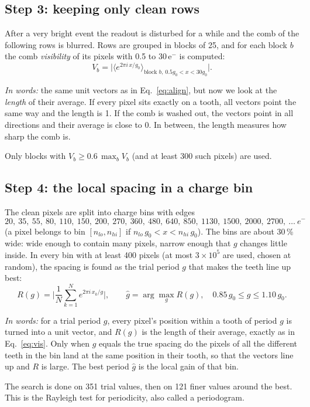 \documentclass[11pt,a4paper]{article}
\newcommand{\eminus}{e$^-$}
\newcommand{\inwords}[1]{\par\noindent\textit{In words:} #1\par}
\begin{document}
\subsection{Step 3: keeping only clean rows}
After a very bright event the readout is disturbed for a while and the comb of the following rows is
blurred. Rows are grouped in blocks of 25, and for each block $b$ the comb \emph{visibility} of its
pixels with 0.5 to 30\,\eminus{} is computed:
\begin{equation}
V_b = \Big| \Big\langle e^{2\pi i\,x/g_0} \Big\rangle_{\text{block } b,\ 0.5 g_0 < x < 30 g_0} \Big| .
\label{eq:vis}
\end{equation}
\inwords{the same unit vectors as in Eq.~\ref{eq:align}, but now we look at the \emph{length} of their
average. If every pixel sits exactly on a tooth, all vectors point the same way and the length is 1.
If the comb is washed out, the vectors point in all directions and their average is close to 0.
In between, the length measures how sharp the comb is.} Only blocks with $V_b \ge 0.6\,\max_b V_b$
(and at least 300 such pixels) are used.

\subsection{Step 4: the local spacing in a charge bin}
\label{sec:R}
The clean pixels are split into charge bins with edges
\[ 20,\ 35,\ 55,\ 80,\ 110,\ 150,\ 200,\ 270,\ 360,\ 480,\ 640,\ 850,\ 1130,\ 1500,\ 2000,\ 2700,\ \dots\ e^- \]
(a pixel belongs to bin $[n_{lo}, n_{hi}]$ if $n_{lo}\,g_0 < x < n_{hi}\,g_0$). The bins are about 30\,\%
wide: wide enough to contain many pixels, narrow enough that $g$ changes little inside. In every bin
with at least 400 pixels (at most $3\times10^5$ are used, chosen at random), the spacing is found as the
trial period $g$ that makes the teeth line up best:
\begin{equation}
R(g) = \Big| \frac{1}{N} \sum_{k=1}^{N} e^{2\pi i\,x_k/g} \Big|, \qquad
\hat g = \arg\max_{g} R(g), \quad 0.85\,g_0 \le g \le 1.10\,g_0 .
\label{eq:R}
\end{equation}
\inwords{for a trial period $g$, every pixel's position within a tooth of period $g$ is turned into a
unit vector, and $R(g)$ is the length of their average, exactly as in Eq.~\ref{eq:vis}. Only when $g$
equals the true spacing do the pixels of all the different teeth in the bin land at the same position
in their tooth, so that the vectors line up and $R$ is large. The best period $\hat g$ is the local
gain of that bin.} The search is done on 351 trial values, then on 121 finer values around the best.
This is the Rayleigh test for periodicity, also called a periodogram.
\end{document}
